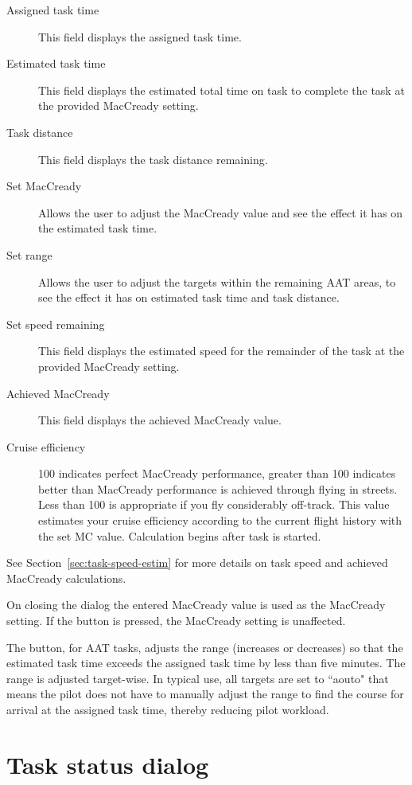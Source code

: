 \documentclass[a4paper,12pt]{refrep}
\begin{document}
\begin{description}
\item[Assigned task time]  This field displays the assigned task time.
\item[Estimated task time]  This field displays the estimated total time 
 on task to complete the task at the provided MacCready setting.
\item[Task distance]  This field displays the task distance remaining.
\item[Set MacCready]  Allows the user to adjust the MacCready value and 
 see the effect it has on the estimated task time.
\item[Set range]  Allows the user to adjust the targets within the remaining 
 AAT areas, to see the effect it has on estimated task time and task distance.
\item[Set speed remaining]  This field displays the estimated speed for the
 remainder of the task at the provided MacCready setting.
\item[Achieved MacCready]  This field displays the achieved MacCready value.
\item[Cruise efficiency]  100 indicates perfect MacCready performance, greater 
than 100 indicates better than MacCready performance is achieved through flying
in streets. Less than 100 is appropriate if you fly considerably off-track. This 
value estimates your cruise efficiency according to the current flight history 
with the set MC value. Calculation begins after task is started.
\end{description}
See Section~\ref{sec:task-speed-estim} for more details on task speed
and achieved MacCready calculations.

On closing the dialog the entered MacCready value is used as the MacCready 
setting. If the  button is pressed, the MacCready setting is 
unaffected.

The  button, for AAT tasks, adjusts the range
(increases or decreases) so that the estimated task time exceeds the
assigned task time by less than five minutes.  The range is adjusted
target-wise. In typical use, all targets are set to ``aouto" that means the pilot 
does not have to manually adjust the range to find the course for arrival at 
the assigned task time, thereby reducing pilot workload.


\section{Task status dialog}
\end{document}
